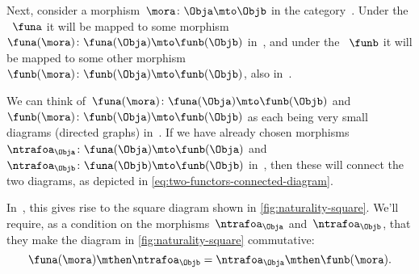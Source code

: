 Next, consider a morphism~$\mora \colon \Obja \mto \Objb$ in the category~\CatC.
Under the ~$\funa$ it will be mapped to some morphism~$\funa(\mora)\colon \funa(\Obja) \mto \funb(\Objb)$ in~\CatD, and under the ~$\funb$ it will be mapped to some other morphism~$\funb(\mora)\colon \funb(\Obja) \mto \funb(\Objb)$, also in~\CatD.

We can think of~$\funa(\mora)\colon \funa(\Obja) \mto \funb(\Objb)$ and~$\funb(\mora)\colon \funb(\Obja) \mto \funb(\Objb)$ as each being very small diagrams (directed graphs) in~\CatD.
If we have already chosen morphisms~$\ntrafoa_\Obja\colon \funa(\Obja) \mto \funb(\Obja)$ and~$\ntrafoa_\Objb\colon \funa(\Objb) \mto \funb(\Objb)$ in~\CatD, then these will connect the two diagrams, as depicted in \cref{eq:two-functors-connected-diagram}.
%

In~\CatD, this gives rise to the square diagram shown in \cref{fig:naturality-square}.
We'll require, as a condition on the morphisms~$\ntrafoa_\Obja$ and~$\ntrafoa_\Objb$, that they make the diagram in \cref{fig:naturality-square} commutative:
\begin{equation}
    \funa(\mora) \mthen \ntrafoa_\Objb = \ntrafoa_\Obja \mthen \funb(\mora).
\end{equation}

%
\begin{marginfigure}
    \centering
    \caption{}
    \label{fig:naturality-square}
\end{marginfigure}
%

